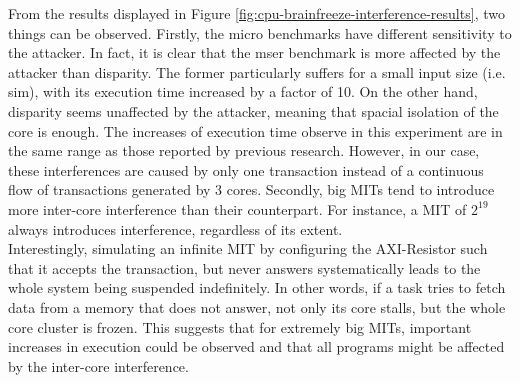     From the results displayed in Figure \ref{fig:cpu-brainfreeze-interference-results}, two things can be observed.
    Firstly, the micro benchmarks have different sensitivity to the attacker. In fact, it is clear that the mser benchmark is more affected by the attacker than disparity.
    The former particularly suffers for a small input size (i.e. sim), with its execution time increased by a factor of 10.
    On the other hand, disparity seems unaffected by the attacker, meaning that spacial isolation of the core is enough.
    The increases of execution time observe in this experiment are in the same range as those reported by previous research.
    However, in our case, these interferences are caused by only one transaction instead of a continuous flow of transactions generated by 3 cores.
    Secondly, big MITs tend to introduce more inter-core interference than their counterpart. For instance, a MIT of $2^{19}$ always introduces interference, regardless of its extent.\\

    Interestingly, simulating an infinite MIT by configuring the AXI-Resistor such that it accepts the transaction, but never answers systematically leads to the whole system being suspended indefinitely.
    In other words, if a task tries to fetch data from a memory that does not answer, not only its core stalls, but the whole core cluster is frozen.
    This suggests that for extremely big MITs, important increases in execution could be observed and that all programs might be affected by the inter-core interference.
